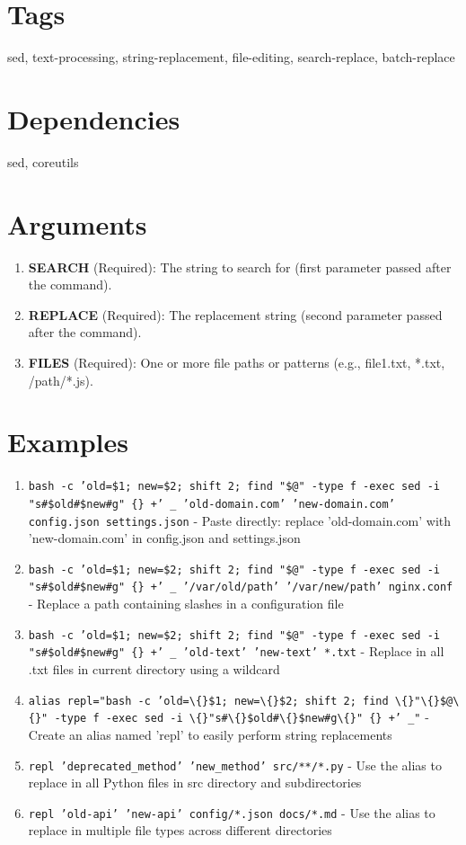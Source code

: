 \documentclass[openany]{book}
\begin{document}
\section*{Tags}
sed, text-processing, string-replacement, file-editing, search-replace, batch-replace

\section*{Dependencies}
sed, coreutils


\section*{Arguments}
\begin{enumerate}
  \item \textbf{SEARCH} (Required): The string to search for (first parameter passed after the command).
  \item \textbf{REPLACE} (Required): The replacement string (second parameter passed after the command).
  \item \textbf{FILES} (Required): One or more file paths or patterns (e.g., file1.txt, *.txt, /path/*.js).
\end{enumerate}

\section*{Examples}
\begin{enumerate}
  \item \texttt{bash -c 'old=\$1; new=\$2; shift 2; find "\$@" -type f -exec sed -i "s\#\$old\#\$new\#g" \{\} +' \_ 'old-domain.com' 'new-domain.com' config.json settings.json} - Paste directly: replace 'old-domain.com' with 'new-domain.com' in config.json and settings.json
  \item \texttt{bash -c 'old=\$1; new=\$2; shift 2; find "\$@" -type f -exec sed -i "s\#\$old\#\$new\#g" \{\} +' \_ '/var/old/path' '/var/new/path' nginx.conf} - Replace a path containing slashes in a configuration file
  \item \texttt{bash -c 'old=\$1; new=\$2; shift 2; find "\$@" -type f -exec sed -i "s\#\$old\#\$new\#g" \{\} +' \_ 'old-text' 'new-text' *.txt} - Replace in all .txt files in current directory using a wildcard
  \item \texttt{alias repl="bash -c 'old=\textbackslash\{\}\$1; new=\textbackslash\{\}\$2; shift 2; find \textbackslash\{\}"\textbackslash\{\}\$@\textbackslash\{\}" -type f -exec sed -i \textbackslash\{\}"s\#\textbackslash\{\}\$old\#\textbackslash\{\}\$new\#g\textbackslash\{\}" \{\} +' \_"} - Create an alias named 'repl' to easily perform string replacements
  \item \texttt{repl 'deprecated\_method' 'new\_method' src/**/*.py} - Use the alias to replace in all Python files in src directory and subdirectories
  \item \texttt{repl 'old-api' 'new-api' config/*.json docs/*.md} - Use the alias to replace in multiple file types across different directories
\end{enumerate}
\end{document}
